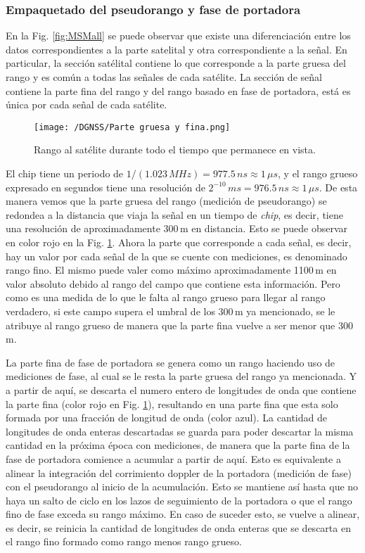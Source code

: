 \documentclass[a4paper,12pt,oneside,onecolumn,final,openright]{book}%
\begin{document}
\subsubsection{Empaquetado del pseudorango y fase de portadora}\label{sec:rrng_frng}
	En la Fig. \ref{fig:MSMall} se puede observar que existe una diferenciación entre los datos correspondientes a la parte satelital y otra correspondiente a la señal. En particular, la sección satélital contiene lo que corresponde a la parte gruesa del rango y es común a todas las señales de cada satélite. La sección de señal contiene la parte fina del rango y del rango basado en fase de portadora, está es única por cada señal de cada satélite. 
	
\begin{figure}
    \centering
    \texttt{[image: /DGNSS/Parte gruesa y fina.png]}
    \caption{Rango al satélite durante todo el tiempo que permanece en vista.}
    \label{fig:rrng_frng}
\end{figure}
	
	El chip tiene un periodo de $1/(1.023\,MHz) = 977.5\,ns \approx 1\,\mu s$, y el rango grueso expresado en segundos tiene una resolución de $2^{-10}\,ms = 976.5\,ns \approx 1\, \mu s$. De esta manera vemos que la parte gruesa del rango (medición de pseudorango) se redondea a la distancia que viaja la señal en un tiempo de \textit{chip}, es decir, tiene una resolución de aproximadamente 300\,m en distancia. Esto se puede observar en color rojo en la Fig. \ref{fig:rrng_frng}. Ahora la parte que corresponde a cada señal, es decir, hay un valor por cada señal de la que se cuente con mediciones, es denominado rango fino. El mismo puede valer como máximo aproximadamente 1100\,m en valor absoluto debido al rango del campo que contiene esta información. Pero como es una medida de lo que le falta al rango grueso para llegar al rango verdadero, si este campo supera el umbral de los 300\,m ya mencionado, se le atribuye al rango grueso de manera que la parte fina vuelve a ser menor que 300\,m.
	
	La parte fina de fase de portadora se genera como un rango haciendo uso de mediciones de fase, al cual se le resta la parte gruesa del rango ya mencionada. Y a partir de aquí, se descarta el numero entero de longitudes de onda que contiene la parte fina (color rojo en Fig. \ref{fig:rrng_frng}), resultando en una parte fina que esta solo formada por una fracción de longitud de onda (color azul). La cantidad de longitudes de onda enteras descartadas se guarda para poder descartar la misma cantidad en la próxima época con mediciones, de manera que la parte fina de la fase de portadora comience a acumular a partir de aquí. Esto es equivalente a alinear la integración del corrimiento doppler de la portadora (medición de fase) con el pseudorango al inicio de la acumulación. Esto se mantiene así hasta que no haya un salto de ciclo en los lazos de seguimiento de la portadora o que el rango fino de fase exceda su rango máximo. En caso de suceder esto, se vuelve a alinear, es decir, se reinicia la cantidad de longitudes de onda enteras que se descarta en el rango fino formado como rango menos rango grueso. 
	
\end{document}

